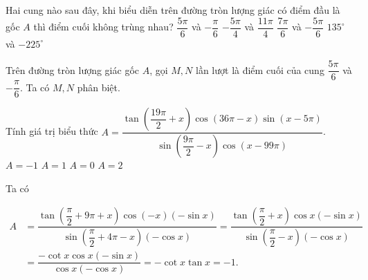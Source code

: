 \begin{ex}%
Hai cung nào sau đây, khi biểu diễn trên đường tròn lượng giác có điểm đầu là gốc $A$ thì điểm cuối không trùng nhau?
\choice
{\True$\dfrac{5\pi}{6}$ và $-\dfrac{\pi}{6}$}
{$-\dfrac{5\pi}{4}$ và $\dfrac{11\pi}{4}$}
{$\dfrac{7\pi}{6}$ và $-\dfrac{5\pi}{6}$}
{$135^\circ$ và $-225^\circ$}
\loigiai
{\immini
{Trên đường tròn lượng giác gốc $A$, gọi $M, N$ lần lượt là điểm cuối của cung $\dfrac{5\pi}{6}$ và $-\dfrac{\pi}{6}$. Ta có $M, N$ phân biệt.}
{
}
}
\end{ex}


\begin{ex}%
Tính giá trị biểu thức $A=\dfrac{\tan\left(\dfrac{19\pi}{2}+x\right)\cos(36\pi-x)\sin(x-5\pi)}{\sin\left(\dfrac{9\pi}{2}-x\right)\cos(x-99\pi)}$.
\choice
{\True $A=-1$}
{$A=1$}
{$A=0$}
{$A=2$}
\loigiai
{Ta có
\begin{center}
$\begin{aligned}A&=\dfrac{\tan\left(\dfrac{\pi}{2}+9\pi+x\right)\cos(-x)(-\sin x)}{\sin\left(\dfrac{\pi}{2}+4\pi-x\right)(-\cos x)}
=\dfrac{\tan\left(\dfrac{\pi}{2}+x\right)\cos x(-\sin x)}{\sin\left(\dfrac{\pi}{2}-x\right)(-\cos x)}\\
&=\dfrac{-\cot x\cos x(-\sin x)}{\cos x(-\cos x)}=-\cot x\tan x=-1.
\end{aligned}$
\end{center}
}
\end{ex}

